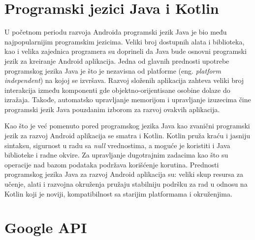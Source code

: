 \documentclass[../TamaraIvanovicMasterRad.tex]{subfiles}
\begin{document}
\section{Programski jezici Java i Kotlin}
U početnom periodu razvoja Androida programski jezik Java je bio među najpopularnijim programskim jezicima. Veliki broj dostupnih alata i biblioteka, kao i velika zajednica programera su doprineli da Java bude osnovni programski jezik za kreiranje Android aplikacija. Jedna od glavnih prednosti upotrebe programskog jezika Java je što je nezavisna od platforme (eng. \textit{platform independent}) na kojoj se izvršava. Razvoj složenih aplikacija zahteva veliki broj interakcija između komponenti gde objektno-orijentisane osobine dolaze do izražaja. Takođe, automatsko upravljanje memorijom i upravljanje izuzecima čine programski jezik Java pouzdanim izborom za razvoj ovakvih aplikacija. 

Kao što je već pomenuto pored programskog jezika Java kao zvanični programski jezik za razvoj Android aplikacija se smatra i Kotlin. Kotlin pruža kraću i jasniju sintaksu, sigurnost u radu sa \textit{null} vrednostima, a moguće je koristiti i Java biblioteke i radne okvire. Za upravljanje dugotrajnim zadacima kao što su operacije nad bazom podataka podržava korišćenje korutina. Prednosti programskog jezika Java za razvoj Android aplikacija su: veliki skup resursa za učenje, alati i razvojna okruženja pružaju stabilniju podršku za rad u odnosu na Kotlin koji je noviji, kompatibilnost sa starijim platformama i okruženjima.


\section{Google API}\label{sec:google}

\end{document}
